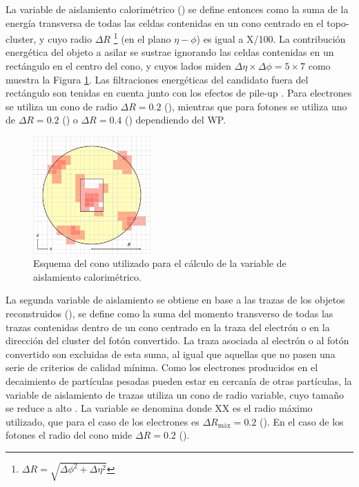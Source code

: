 La variable de aislamiento calorimétrico \cite{PERF-2017-01} () se define entonces como la suma de la energía transversa de todas las celdas contenidas en un cono centrado en el topo-cluster, y cuyo radio $\Delta R$ \footnote{$\Delta R=\sqrt{\Delta\phi^2+\Delta\eta^2}$} (en el plano $\eta-\phi$) es igual a X/100. La contribución energética del objeto a asilar se sustrae ignorando las celdas contenidas en un rectángulo en el centro del cono, y cuyos lados miden $\Delta\eta\times\Delta\phi = 5 \times 7$ como muestra la Figura \ref{fig:IDcone}. Las filtraciones energéticas del candidato fuera del rectángulo son tenidas en cuenta junto con los efectos de pile-up \cite{Cacciari_2008}. Para electrones se utiliza un cono de radio $\Delta R = 0.2$ (), mientras que para fotones se utiliza uno de $\Delta R = 0.2$ () o $\Delta R = 0.4$ () dependiendo del WP.


\begin{figure}
\centering
  \includegraphics[width=0.4\textwidth]{images/objects/iso.pdf}
\caption{Esquema del cono utilizado para el cálculo de la variable de aislamiento calorimétrico.}
  \label{fig:IDcone}
\end{figure}


La segunda variable de aislamiento se obtiene en base a las trazas de los objetos reconstruidos (), se define como la suma del momento transverso de todas las trazas contenidas dentro de un cono centrado en la traza del electrón o en la dirección del cluster del fotón convertido. La traza asociada al electrón o al fotón convertido son excluidas de esta suma, al igual que aquellas que no pasen una serie de criterios de calidad mínima. Como los electrones producidos en el decaimiento de partículas pesadas pueden estar en cercanía de otras partículas, la variable de aislamiento de trazas utiliza un cono de radio variable, cuyo tamaño se reduce a alto \pt. La variable se denomina  donde XX es el radio máximo utilizado, que para el caso de los electrones es $\Delta R_{\text{máx}} = 0.2$ (). En el caso de los fotones el radio del cono mide $\Delta R = 0.2$ ().

